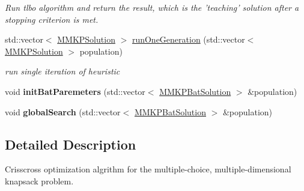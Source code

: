 \begin{DoxyCompactItemize}
\begin{DoxyCompactList}\small\item\em Run tlbo algorithm and return the result, which is the 'teaching' solution after a stopping criterion is met. \end{DoxyCompactList}\item 
\hypertarget{class_m_m_k_p___b_b_a_ac5ecabe29a6727328eee8b4899ae5b77}{std\+::vector$<$ \hyperlink{class_m_m_k_p_solution}{M\+M\+K\+P\+Solution} $>$ \hyperlink{class_m_m_k_p___b_b_a_ac5ecabe29a6727328eee8b4899ae5b77}{run\+One\+Generation} (std\+::vector$<$ \hyperlink{class_m_m_k_p_solution}{M\+M\+K\+P\+Solution} $>$ population)}\label{class_m_m_k_p___b_b_a_ac5ecabe29a6727328eee8b4899ae5b77}

\begin{DoxyCompactList}\small\item\em run single iteration of heuristic \end{DoxyCompactList}\item 
\hypertarget{class_m_m_k_p___b_b_a_a35ef47fbf5ddc306c56269c86492b513}{void {\bfseries init\+Bat\+Paremeters} (std\+::vector$<$ \hyperlink{struct_m_m_k_p_bat_solution}{M\+M\+K\+P\+Bat\+Solution} $>$ \&population)}\label{class_m_m_k_p___b_b_a_a35ef47fbf5ddc306c56269c86492b513}

\item 
\hypertarget{class_m_m_k_p___b_b_a_a69ed03ff0cfc287e99fdadf22b895837}{void {\bfseries global\+Search} (std\+::vector$<$ \hyperlink{struct_m_m_k_p_bat_solution}{M\+M\+K\+P\+Bat\+Solution} $>$ \&population)}\label{class_m_m_k_p___b_b_a_a69ed03ff0cfc287e99fdadf22b895837}

\end{DoxyCompactItemize}


\subsection{Detailed Description}
Crisscross optimization algrithm for the multiple-\/choice, multiple-\/dimensional knapsack problem. 

